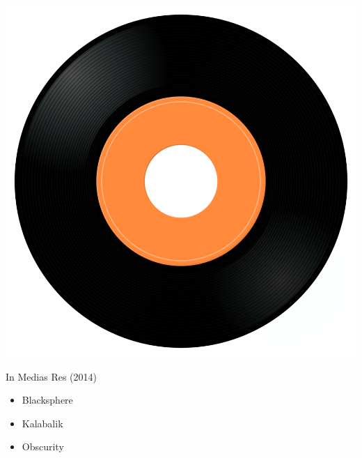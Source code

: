 \begin{minipage}[t]{0.25\textwidth}\vspace{0pt}
\captionsetup{type=figure}
\includegraphics[width=\textwidth]{Images/cover.png}
\caption*{In Medias Res (2014)}
\end{minipage}
\begin{minipage}[t]{0.25\textwidth}\vspace{0pt}
\begin{itemize}[nosep,leftmargin=1em,labelwidth=*,align=left]
	\setlength{\itemsep}{0pt}
	\item Blacksphere
	\item Kalabalik
	\item Obscurity
\end{itemize}
\end{minipage}
